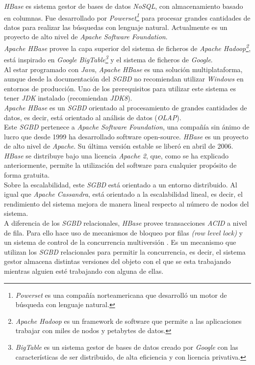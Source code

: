 \documentclass[3pt]{article}
\begin{document}
\emph{HBase} es sistema gestor de bases de datos \emph{NoSQL}, con almacenamiento basado en columnas. Fue desarrollado por \emph{Powerset\footnote{\emph{Powerset} es una compañía norteamericana que desarrolló un motor de búsqueda con lenguaje natural.\cite{WIKI:7}}} para procesar grandes cantidades de datos para realizar las búsquedas con lenguaje natural. Actualmente es un proyecto de alto nivel de \emph{Apache Software Foundation}. \cite{WIKI:8}\\
\emph{Apache HBase} provee la capa superior del sistema de ficheros de \emph{Apache Hadoop\footnote{\emph{Apache Hadoop} es un framework de software que permite a las aplicaciones trabajar con miles de nodos y petabytes de datos.\cite{WIKI:9}}}, está inspirado en \emph{Google BigTable\footnote{\emph{BigTable} es un sistema gestor de bases de datos creado por \emph{Google} con las características de ser distribuido, de alta eficiencia y con licencia privativa.\cite{WIKI:10}}} y el sistema de ficheros de \emph{Google}.\\

Al estar programado con \emph{Java}, \emph{Apache HBase} es una solución multiplataforma, aunque desde la documentación del \emph{SGBD} no recomiendan utilizar \emph{Windows} en entornos de producción. Uno de los prerequisitos para utilizar este sistema es tener \emph{JDK} instalado (recomiendan \emph{JDK8}). \cite{AP:6}\\

\emph{Apache HBase} es un \emph{SGBD} orientado al procesamiento de grandes cantidades de datos, es decir, está orientado al análisis de datos (\emph{OLAP}).\\
Este \emph{SGBD} pertenece a \emph{Apache Software Foundation}, una compañía sin ánimo de lucro que desde 1999 ha desarrollado software open-source. \emph{HBase} es un proyecto de alto nivel de \emph{Apache}. Su última versión estable se liberó en abril de 2006. \cite{WIKI:8} \\
\emph{HBase} se distribuye bajo una licencia \emph{Apache 2}, que, como se ha explicado anteriormente, permite la utilización del software para cualquier propósito de forma gratuita. \cite{WIKI:6}\\

Sobre la escalabilidad, este \emph{SGBD} está orientado a un entorno distribuido. Al igual que \emph{Apache Cassandra}, está orientado a la escalabilidad lineal, es decir, el rendimiento del sistema mejora de manera lineal respecto al número de nodos del sistema. \cite{AP:7} \\
A diferencia de los \emph{SGBD} relacionales, \emph{HBase} provee transacciones \emph{ACID} a nivel de fila. Para ello hace uso de mecanismos de bloqueo por filas \emph{(row level lock)} y un sistema de control de la concurrencia multiversión \cite{BAP:1}\cite{QL:1}. Es un mecanismo que utilizan los \emph{SGBD} relacionales para permitir la concurrencia, es decir, el sistema gestor almacena distintas versiones del objeto con el que se esta trabajando mientras alguien esté trabajando con alguna de ellas. \cite{WIKI:12} \\
\end{document}
